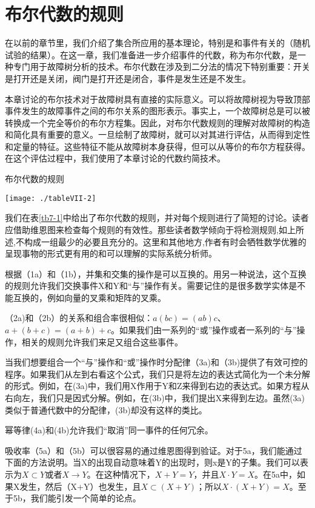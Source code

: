 \documentclass[cn,11pt,chinese]{elegantbook}
\begin{document}
\section{布尔代数的规则}

在以前的章节里，我们介绍了集合所应用的基本理论，特别是和事件有关的（随机试验的结果）。在这一章，我们准备进一步介绍事件的代数，称为布尔代数，是一种专门用于故障树分析的技术。布尔代数在涉及到二分法的情况下特别重要：开关是打开还是关闭，阀门是打开还是闭合，事件是发生还是不发生。

本章讨论的布尔技术对于故障树具有直接的实际意义。可以将故障树视为导致顶部事件发生的故障事件之间的布尔关系的图形表示。事实上，一个故障树总是可以被转换成一个完全等价的布尔方程集。因此，对布尔代数规则的理解对故障树的构造和简化具有重要的意义。一旦绘制了故障树，就可以对其进行评估，从而得到定性和定量的特征。这些特征不能从故障树本身获得，但可以从等价的布尔方程获得。在这个评估过程中，我们使用了本章讨论的代数约简技术。

\begin{table}
	\caption{布尔代数的规则}
	\label{tb7-1}
	\texttt{[image: ./tableVII-2]}
\end{table}

我们在表\ref{tb7-1}中给出了布尔代数的规则，并对每个规则进行了简短的讨论。读者应借助维恩图来检查每个规则的有效性。那些读者数学倾向于将检测规则,如上所述,不构成一组最少的必要且充分的。这里和其他地方,作者有时会牺牲数学优雅的呈现事物的形式更有用的和可以理解的实际系统分析师。

根据（1a）和（1b），并集和交集的操作是可以互换的。用另一种说法，这个互换的规则允许我们交换事件X和Y和“与”操作有关。需要记住的是很多数学实体是不能互换的，例如向量的叉乘和矩阵的叉乘。

（2a)和（2b）的关系和组合率很相似：$a(bc)=(ab)c$、$a+(b+c)=(a+b)+c$。如果我们由一系列的“或”操作或者一系列的“与”操作，相关的规则允许我们来足又组合这些事件。

当我们想要组合一个“与”操作和“或”操作时分配律（3a)和（3b)提供了有效可控的程序。如果我们从左到右看这个公式，我们只是将左边的表达式简化为一个未分解的形式。例如，在(3a)中，我们用X作用于Y和Z来得到右边的表达式。如果方程从右向左，我们只是因式分解。例如，在(3b)中，我们提出X来得到左边。虽然(3a)类似于普通代数中的分配律，(3b)却没有这样的类比。

幂等律(4a)和(4b)允许我们“取消”同一事件的任何冗余。

吸收率（5a）和（5b）可以很容易的通过维恩图得到验证。对于5a，我们能通过下面的方法说明。当X的出现自动意味着Y的出现时，则x是Y的子集。我们可以表示为$X\subset Y$或者$X\to Y$。在这种情况下，$X+Y=Y$，并且$X\cdot Y=X$。在5a中，如果X发生，然后（X+Y）也发生，且$X\subset(X+Y)$；所以$X\cdot (X+Y)=X$。至于5b，我们能引发一个简单的论点。
\end{document}
